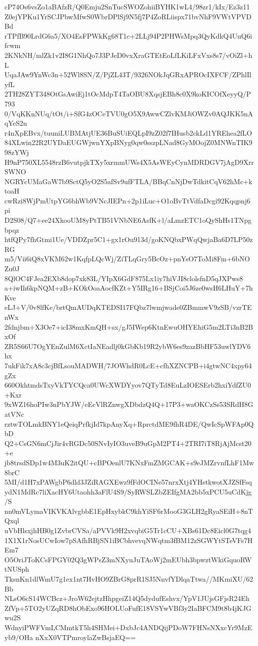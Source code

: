 cP74Os6vsZo1aBAfzR/Q0Emju2SnTucSWOZohiiBYHK1wL4/98zr1/kIx/Ez3z11
Z0ejYPKu1YrSCJPbwMfwS0WbrDPlSj9N5fj7P4ZoRLiispx71bvNhF9VWtVPVDBd
rTPfB90LrdG6a5/XO4EsFPWkKg68T1c+2LLj94P2PHWsMpq3QyKdkQ4UuQ6ifcwm
2KNkNH/mlZk1v2I8G1NhQo7J3PJeD0vxXraGTEtEoLfLKiLFxVxs8s7/vOiZl+hL
UqaJAw9YnWc3n+52Wl8SN/Z/PjZL43T/9326NOkJqGRxAPROcIXFCF/ZPhlIlyfL
2TH28ZYT348OtGsAwiEj1tOcMdpT4TaOBU8XqsjEBh8c0X9koKICOfXeyyQ/P793
0/VqKKnNUq/tOt/i+SfG4zOCeTVU0gO5X9AwwCZlvKMJiOWZv0AQJKK5nAqYeS2n
r4nXpEBvx/tuuniLUBMAtjUE36BuSUiEQLpI9zZ02f7IHusb2ckLd1YREhea2fLO
84XLwin22R2UYDaEUGWjwnYXpBNyg0qw0sszpLNad8GyMOojZ0MNWnTIK998zYWj
H9nP750XL5548rzB6vutpjkTXy5xrmmUWs4X5AsWEyCynMDRDGV7jAgD9XrrSWNO
NGRYcUMaGaW7b9SctQ5yO2S5afSv9ufFTLA/BBqCnNjDwTdkitCqV62hMc+ktoaH
cwRzi8WjPmUtpYG6bhWb9VNcJIEPn+2p1iLuc+O1oBvTtVdfaDcgi92Kqqpnj6pi
D2S08/Q7+ee24XkooUM8yPtTB51VNbNE6AsfK+l/aLmzETC1oQyShHs1TNpgbpqz
htfQPy7fhGtmi1Ue/VDDZpr5C1+gx1rOu913d/goKNQbxPWqQwjaBa6D7LP50zRG
m5/Vii6iQ8xVKM62w1KqfpLQcWj/ZiTLqGry5BcOz+pnYsO7ToMi8Fm+6bNOZu0J
8QlOC4FJea2EXb8dop7xk83L/YIpX6GdF875Lx1iy7hiVJI8clolsfnD5qJXPws8
a+iwIh6kpNQM+zB+KOkOoaAocfKZt+Y5IRg16+BSjCoi5J6ze0wsH6LHuY+7hKve
eLJ+V/0v8lfKe/brtQmAUDqKTEDSI17FQbz7lwmjwade0ZBmmwV9zSB/vzrTEnWx
2fdnjbm+X3Oe7+icI38mxKmQH+sx/gJ5IWep6KtnEwuOHYEhiG5m2LTi3nB2BxOf
ZR5S66U7OgYEnZulM6XctIaNEadlj0kGbKb19R2ybW6es9zazBbHF53uwlYDV6hx
7ukFik7xA8c3cjBfLsouMADWH/7JOWhdR0LcE+cfhXZNCPB+i4gtwNC4xpy64gZx
660OkhtmdsTxyVkTYCQca0UWcXWDYyov7QTyTd8EuLzIOESErb2hxiYdfZU0+Kxr
9xWZ16hoPIw3nPbYJW/eEcVlRZnwgXDbdzQ4Q+17P3+waOKCzSs53SRdH8GatVNc
rztwTOLmkBNY1eQeiqPrfkjId7kpAnyXq+RprctdME9fhR4DE/QwIcSpWFAp0QbD
Q2+CsGN6mCjJir4vRGDc50SNvIyIO3uveB9uGpM2PT4+2TRI7iT8RjAjMcst20+e
jb8trsdSDp1w4M3uK2itQU+cBPOenlU7KNxFmZMGCAK+s9eJMZrvnfLhF1Mw8brC
5MI/d1H7xPAWgbP6dld3JZiRAGXEwz9fFdOCINe57nrxXtj4YHstkwotXJZSfFsq
ydN1MdRc7liXacHY6Utaohh3aFlU4S9/SyRWSLZbZEIfgMA2bb5xPCU5uCdKjg/S
nn0mVLymaVIKVKAlvgbbE1EpHxybkC9khYiSF6rMooG3GLH2gRyaSEiH+8nTQxql
uVbHlsxjhHB0g1ZvbrCVSa/aPVVk9H2xvqbiG5Tr1cCU+XBs61Dc8Eicl0G7tqg4
1X1X1rNosUCwIow7pSAfhRBjSN1iBCbhvevqNWqtm3fBM12zSGWYtSTeVFs7HEm7
O5OriJToKCsFPGY02Q3gWPsZ3mNXyuJuTAoWj2mEUbh3bpwztWkiGquoRWtNUSph
TksnKn1dlWmU7g1ex1nt7HvHO9ZBrG8prR1SJ5NnvfYDlqaTtwa//MKmiXU/62Bb
NLsO6cS14WCBcz+JroW62ejtzHhpgeiZ14Q5dydufEshvx/YpV1JUjsGFjsR24Eh
ZfVp+5TO2yUZqRD8hObExo96HOLUoFufE18VSYwVBf3y2IaBFCM9t8b4jKJGwu2S
WdnyiPWFVmLCMmtkT5h4SHMei+DxbJc4ANDQijPDoW7FHNsNXxcYr9MzEyb9/OHa
nXxX0VTPmroylaZwBsjaEQ==
